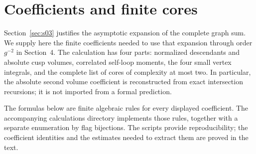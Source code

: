 \section{Coefficients and finite cores}
\label{sec:appendix-a}

Section~\ref{sec:s03} justifies the asymptotic expansion of the complete
graph sum. We supply here the finite coefficients needed to use that
expansion through order $g^{-2}$ in Section~4. The calculation has four
parts: normalized descendants and absolute cusp volumes, correlated
self-loop moments, the four small vertex integrals, and the complete
list of cores of complexity at most two. In particular, the absolute
second volume coefficient is reconstructed from exact intersection
recursions; it is not imported from a formal prediction.

The formulas below are finite algebraic rules for every displayed
coefficient. The accompanying calculations directory implements those
rules, together with a separate enumeration by flag bijections. The
scripts provide reproducibility; the coefficient identities and the
estimates needed to extract them are proved in the text.





